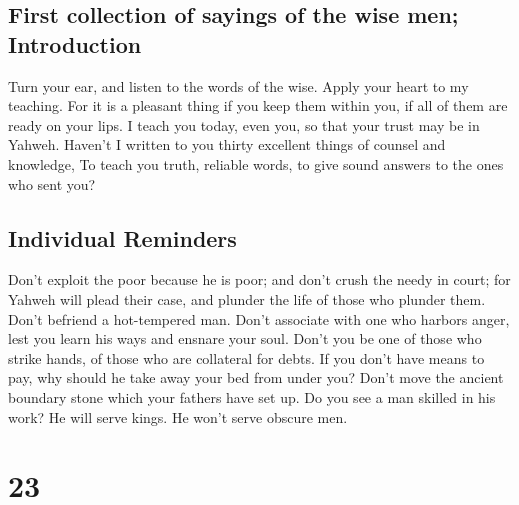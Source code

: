 \hypertarget{first-collection-of-sayings-of-the-wise-men-introduction}{%
\subsection{First collection of sayings of the wise men;
Introduction}\label{first-collection-of-sayings-of-the-wise-men-introduction}}

 Turn your ear, and listen to the words of the wise.
Apply your heart to my teaching.  For it is a pleasant
thing if you keep them within you, if all of them are ready on your
lips.  I teach you today, even you, so that your trust
may be in Yahweh.  Haven't I written to you thirty
excellent things of counsel and knowledge,  To teach you
truth, reliable words, to give sound answers to the ones who sent you?

\hypertarget{individual-reminders}{%
\subsection{Individual Reminders}\label{individual-reminders}}

 Don't exploit the poor because he is poor; and don't
crush the needy in court;  for Yahweh will plead their
case, and plunder the life of those who plunder them. 
Don't befriend a hot-tempered man. Don't associate with one who harbors
anger,  lest you learn his ways and ensnare your soul.
 Don't you be one of those who strike hands, of those who
are collateral for debts.  If you don't have means to
pay, why should he take away your bed from under you? 
Don't move the ancient boundary stone which your fathers have set up.
 Do you see a man skilled in his work? He will serve
kings. He won't serve obscure men.

\hypertarget{section-22}{%
\section{23}\label{section-22}}

